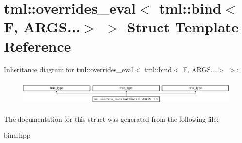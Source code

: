 \hypertarget{structtml_1_1overrides__eval_3_01tml_1_1bind_3_01F_00_01ARGS_8_8_8_4_01_4}{\section{tml\+:\+:overrides\+\_\+eval$<$ tml\+:\+:bind$<$ F, A\+R\+G\+S...$>$ $>$ Struct Template Reference}
\label{structtml_1_1overrides__eval_3_01tml_1_1bind_3_01F_00_01ARGS_8_8_8_4_01_4}
}
Inheritance diagram for tml\+:\+:overrides\+\_\+eval$<$ tml\+:\+:bind$<$ F, A\+R\+G\+S...$>$ $>$\+:\begin{figure}[H]
\begin{center}
\leavevmode
\includegraphics[height=1.347774cm]{structtml_1_1overrides__eval_3_01tml_1_1bind_3_01F_00_01ARGS_8_8_8_4_01_4}
\end{center}
\end{figure}


The documentation for this struct was generated from the following file\+:\begin{DoxyCompactItemize}
\item 
bind.\+hpp\end{DoxyCompactItemize}
